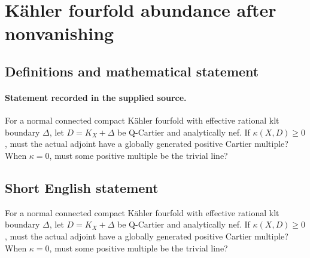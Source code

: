 \documentclass[11pt]{article}
\begin{document}
\section*{Kähler fourfold abundance after nonvanishing}\label{statement}
\subsection{Definitions and mathematical statement}
\paragraph{Statement recorded in the supplied source.}
For a normal connected compact Kähler fourfold with effective rational klt boundary $\Delta $, let $D=K_X+\Delta $ be Q-Cartier and analytically nef. If $\kappa (X,D)\geq 0$, must the actual adjoint have a globally generated positive Cartier multiple? When $\kappa =0$, must some positive multiple be the trivial line?
\subsection{Short English statement}
For a normal connected compact Kähler fourfold with effective rational klt boundary $\Delta $, let $D=K_X+\Delta $ be Q-Cartier and analytically nef. If $\kappa (X,D)\geq 0$, must the actual adjoint have a globally generated positive Cartier multiple? When $\kappa =0$, must some positive multiple be the trivial line?
\end{document}

